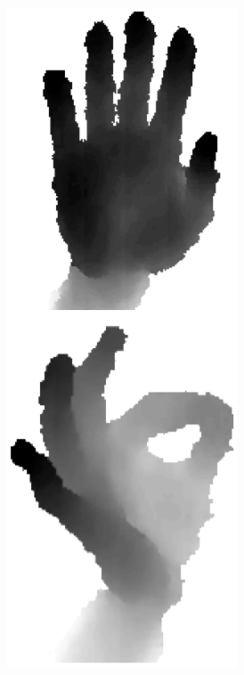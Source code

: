 \begin{figure}[ht]
\centering
        \begin{subfigure}{0.25\textwidth}
                \centering
                \includegraphics[width=0.75\textwidth]{figures_1_hand_tracking/Kinect_tiled}

\end{subfigure}
\end{figure}
